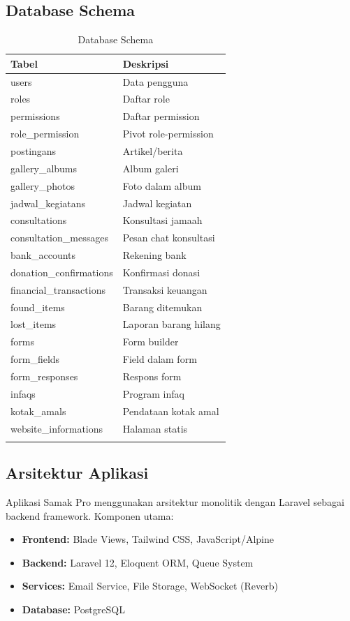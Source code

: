 \documentclass[12pt,a4paper]{article}
\begin{document}
\subsection{Database Schema}
\begin{longtable}{|l|p{8cm}|}
\hline
\textbf{Tabel} & \textbf{Deskripsi} \\
\hline
\endfirsthead
users & Data pengguna \\
roles & Daftar role \\
permissions & Daftar permission \\
role\_permission & Pivot role-permission \\
postingans & Artikel/berita \\
gallery\_albums & Album galeri \\
gallery\_photos & Foto dalam album \\
jadwal\_kegiatans & Jadwal kegiatan \\
consultations & Konsultasi jamaah \\
consultation\_messages & Pesan chat konsultasi \\
bank\_accounts & Rekening bank \\
donation\_confirmations & Konfirmasi donasi \\
financial\_transactions & Transaksi keuangan \\
found\_items & Barang ditemukan \\
lost\_items & Laporan barang hilang \\
forms & Form builder \\
form\_fields & Field dalam form \\
form\_responses & Respons form \\
infaqs & Program infaq \\
kotak\_amals & Pendataan kotak amal \\
website\_informations & Halaman statis \\
\hline
\caption{Database Schema}
\end{longtable}

\subsection{Arsitektur Aplikasi}
Aplikasi Samak Pro menggunakan arsitektur monolitik dengan Laravel sebagai backend framework. Komponen utama:

\begin{itemize}
    \item \textbf{Frontend:} Blade Views, Tailwind CSS, JavaScript/Alpine
    \item \textbf{Backend:} Laravel 12, Eloquent ORM, Queue System
    \item \textbf{Services:} Email Service, File Storage, WebSocket (Reverb)
    \item \textbf{Database:} PostgreSQL
\end{itemize}
\end{document}
